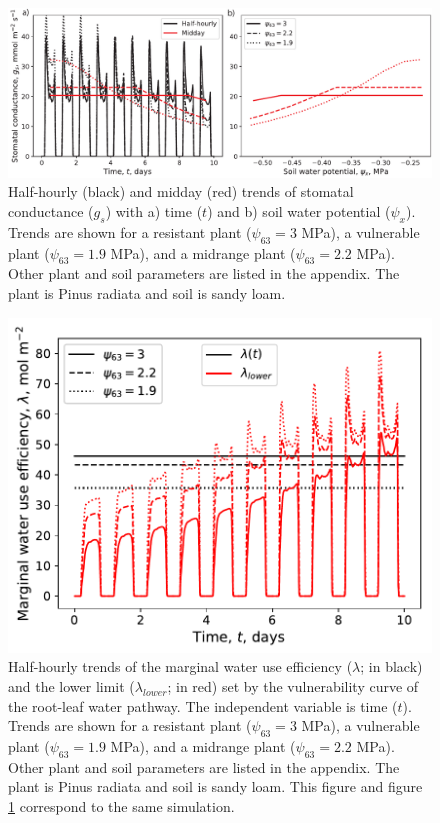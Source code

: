 \documentclass[utf8]{frontiersSCNS} %
\begin{document}
\begin{figure}[h]
    \begin{center}
         \includegraphics[scale=0.75]{gs_resistant_vulnerable.pdf} 
    \end{center}
    \caption{Half-hourly (black) and midday (red) trends of stomatal conductance ($g_s$) with a) time ($t$) and b) soil water potential ($\psi_x$). Trends are shown for a resistant plant ($\psi_{63} = 3$ MPa), a vulnerable plant ($\psi_{63} = 1.9$ MPa), and a midrange plant ($\psi_{63} = 2.2$ MPa). Other plant and soil parameters are listed in the appendix. The plant is Pinus radiata and soil is sandy loam.}
    \label{fig:resistant_vulnerable_gs}
\end{figure}

\begin{figure}[h]
    \begin{center}
         \includegraphics[scale=0.75]{lam_resistant_vulnerable.pdf}   
    \end{center}
    \caption{Half-hourly trends of the marginal water use efficiency ($\lambda$; in black) and the lower limit ($\lambda_{lower}$; in red) set by the vulnerability curve of the root-leaf water pathway. The independent variable is time ($t$). Trends are shown for a resistant plant ($\psi_{63} = 3$ MPa), a vulnerable plant ($\psi_{63} = 1.9$ MPa), and a midrange plant ($\psi_{63} = 2.2$ MPa). Other plant and soil parameters are listed in the appendix. The plant is Pinus radiata and soil is sandy loam. This figure and figure \ref{fig:resistant_vulnerable_gs} correspond to the same simulation.}
    \label{fig:resistant_vulnerable_lambda}
\end{figure}
\end{document}
